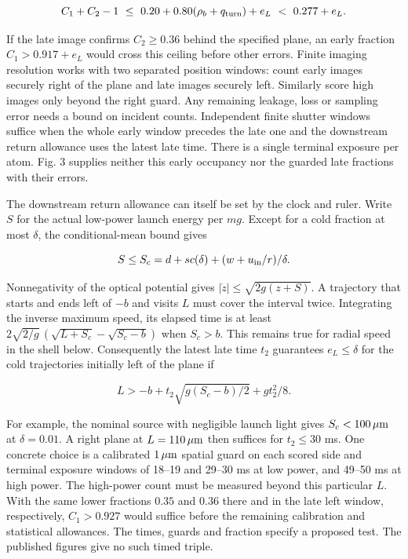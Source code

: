 \documentclass[11pt,a4paper]{article}
\begin{document}
\[
 C_1+C_2-1\ \le\ 0.20+0.80(\rho_b+q_{\rm turn})+e_L
                \ <\ 0.277+e_L .
\]

If the late image confirms \(C_2\ge0.36\) behind the specified plane, an
early fraction \(C_1>0.917+e_L\) would cross this ceiling before other
errors. Finite imaging resolution works with two separated position
windows: count early images securely right of the plane and late images
securely left. Similarly score high images only beyond the right guard.
Any remaining leakage, loss or sampling error needs a bound on incident
counts. Independent finite shutter windows suffice when the whole early
window precedes the late one and the downstream return allowance uses
the latest late time. There is a single terminal exposure per atom. Fig.
3 supplies neither this early occupancy nor the guarded late fractions
with their errors.

The downstream return allowance can itself be set by the clock and
ruler. Write \(S\) for the actual low-power launch energy per \(mg\).
Except for a cold fraction at most \(\delta\), the conditional-mean
bound gives

\[
 S\le S_c=d+s c(\delta)+(w+u_{\rm in}/r)/\delta .
\]

Nonnegativity of the optical potential gives
\(|\dot z|\le\sqrt{2g(z+S)}\). A trajectory that starts and ends left of
\(-b\) and visits \(L\) must cover the interval twice. Integrating the
inverse maximum speed, its elapsed time is at least
\(2\sqrt{2/g}\,(\sqrt{L+S_c}-\sqrt{S_c-b})\) when \(S_c>b\). This
remains true for radial speed in the shell below. Consequently the
latest late time \(t_2\) guarantees \(e_L\le\delta\) for the cold
trajectories initially left of the plane if

\[
 L>-b+t_2\sqrt{g(S_c-b)/2}+g t_2^2/8.
\]

For example, the nominal source with negligible launch light gives
\(S_c<100\,\mu{\rm m}\) at \(\delta=0.01\). A right plane at
\(L=110\,\mu{\rm m}\) then suffices for \(t_2\le30\) ms. One concrete
choice is a calibrated \(1\,\mu{\rm m}\) spatial guard on each scored
side and terminal exposure windows of 18--19 and 29--30 ms at low power,
and 49--50 ms at high power. The high-power count must be measured
beyond this particular \(L\). With the same lower fractions \(0.35\) and
\(0.36\) there and in the late left window, respectively, \(C_1>0.927\)
would suffice before the remaining calibration and statistical
allowances. The times, guards and fraction specify a proposed test. The
published figures give no such timed triple.
\end{document}
